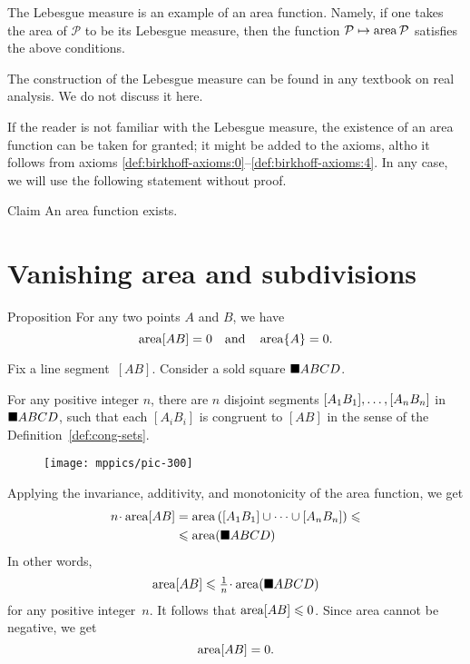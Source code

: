 {The Lebesgue measure is an example of an area function.
Namely, if one takes the area of $\mathcal{P}$ to be its Lebesgue measure,
then the function $\mathcal{P} \mapsto \mathop{\rm area}\nolimits\mathcal{P}$ satisfies the above conditions.

The construction of the Lebesgue measure can be found in any textbook on real analysis.
We do not discuss it here.

If the reader is not familiar with the Lebesgue measure, the existence of an area function can be taken for granted;
it might be added to the axioms, altho it follows from axioms \ref{def:birkhoff-axioms:0}--\ref{def:birkhoff-axioms:4}.
In any case, we will use the following statement without proof.

\begin{thm}{Claim}
An area function exists.
\end{thm}


\section{Vanishing area and subdivisions}

\begin{thm}{Proposition}\label{prop:area-segment}
For any two points $A$ and $B$, we have
\[\mathop{\rm area}\nolimits[AB]=0\quad\text{and}\quad\mathop{\rm area}\nolimits\{A\}=0.\]
\end{thm}

Fix a line segment~$[AB]$.
Consider a sold square $\blacksquare ABCD$.

For any positive integer $n$,
there are $n$ disjoint segments $[A_1B_1],\dots,[A_nB_n]$ 
in $\blacksquare ABCD$,
such that each $[A_iB_i]$ is congruent to $[AB]$ in the sense of the Definition~\ref{def:cong-sets}.

\begin{wrapfigure}[10]{o}{37 mm}
\vskip-2mm
\centering
\texttt{[image: mppics/pic-300]}
\vskip0mm
\end{wrapfigure}

Applying the invariance, additivity, and monotonicity of the area function, 
we get
\begin{align*}
n\cdot \area[AB]
&=\area\left([A_1B_1]\cup\dots\cup[A_nB_n]\right)\le
\\
&\le \area(\solidsquare ABCD)              
\end{align*}
In other words,
\[\area[AB]\le \tfrac1n\cdot\area(\solidsquare ABCD)\] 
for any positive integer~$n$.
It follows that $\mathop{\rm area}\nolimits[AB]\leqslant 0$. 
Since area cannot be negative, we get
\[\mathop{\rm area}\nolimits[AB]= 0.\]

}
